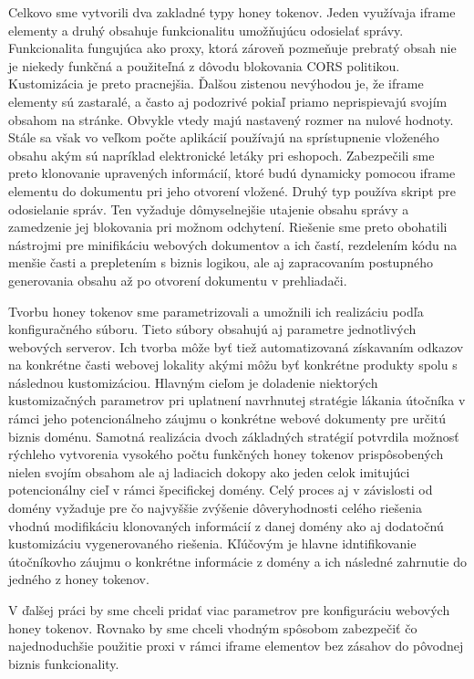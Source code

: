 \documentclass[conference, 11pt,slovak,a4paper,twoside]{IEEEtran}
\begin{document}
Celkovo sme vytvorili dva zakladné typy honey tokenov. Jeden využívaja iframe elementy a druhý obsahuje funkcionalitu umožňujúcu odosielať správy. Funkcionalita fungujúca ako proxy, ktorá zároveň pozmeňuje prebratý obsah nie je niekedy funkčná a použiteľná z dôvodu blokovania CORS politikou. Kustomizácia je preto pracnejšia. Ďalšou zistenou nevýhodou je, že iframe elementy sú zastaralé, a často aj podozrivé pokiaľ priamo neprispievajú svojím obsahom na stránke. Obvykle vtedy majú nastavený rozmer na nulové hodnoty. Stále sa však vo veľkom počte aplikácií používajú na sprístupnenie vloženého obsahu akým sú napríklad elektronické letáky pri eshopoch. Zabezpečili sme preto klonovanie upravených informácií, ktoré budú dynamicky pomocou iframe elementu do dokumentu pri jeho otvorení vložené. Druhý typ používa skript pre odosielanie správ. Ten vyžaduje dômyselnejšie utajenie obsahu správy a zamedzenie jej blokovania pri možnom odchytení. Riešenie sme preto obohatili nástrojmi pre minifikáciu webových dokumentov a ich častí, rezdelením kódu na menšie časti a prepletením s biznis logikou, ale aj zapracovaním postupného generovania obsahu až po otvorení dokumentu v prehliadači.

Tvorbu honey tokenov sme parametrizovali a umožnili ich realizáciu podľa konfiguračného súboru. Tieto súbory obsahujú aj parametre jednotlivých webových serverov. Ich tvorba môže byť tiež automatizovaná získavaním odkazov na konkrétne časti webovej lokality akými môžu byť konkrétne produkty spolu s následnou kustomizáciou. Hlavným cieľom je doladenie niektorých kustomizačných parametrov pri uplatnení navrhnutej stratégie lákania útočníka v rámci jeho potencionálneho záujmu o konkrétne webové dokumenty pre určitú biznis doménu. Samotná realizácia dvoch základných stratégií potvrdila možnosť rýchleho vytvorenia vysokého počtu funkčných honey tokenov prispôsobených nielen svojím obsahom ale aj ladiacich dokopy ako jeden celok imitujúci potencionálny cieľ v rámci špecifickej domény. Celý proces aj v závislosti od domény vyžaduje pre čo najvyššie zvýšenie dôveryhodnosti celého riešenia vhodnú modifikáciu klonovaných informácií z danej domény ako aj dodatočnú kustomizáciu vygenerovaného riešenia. Kľúčovým je hlavne idntifikovanie útočníkovho záujmu o konkrétne informácie z domény a ich následné zahrnutie do jedného z honey tokenov.

V ďalšej práci by sme chceli pridať viac parametrov pre konfiguráciu webových honey tokenov. Rovnako by sme chceli vhodným spôsobom zabezpečiť čo najednoduchšie použitie proxi v rámci iframe elementov bez zásahov do pôvodnej biznis funkcionality. 


\end{document}
